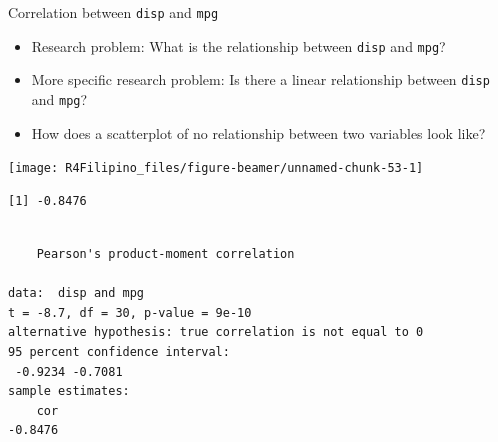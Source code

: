 \begin{frame}[fragile]{Correlation between \texttt{disp} and
\texttt{mpg}}

\begin{itemize}
\tightlist
\item
  Research problem: What is the relationship between \texttt{disp} and
  \texttt{mpg}?
\item
  More specific research problem: Is there a linear relationship between
  \texttt{disp} and \texttt{mpg}?
\item
  How does a scatterplot of no relationship between two variables look
  like?
\end{itemize}

\begin{Shaded}
\begin{Highlighting}[]
\NormalTok{(}\StringTok{ }\NormalTok{(}\NormalTok{)}
\NormalTok{(}\StringTok{ }\NormalTok{(}\NormalTok{)}
\end{Highlighting}
\end{Shaded}

\begin{center}\texttt{[image: R4Filipino\_files/figure-beamer/unnamed-chunk-53-1]} \end{center}

\begin{Shaded}
\begin{Highlighting}[]
\end{Highlighting}
\end{Shaded}

\begin{verbatim}
[1] -0.8476
\end{verbatim}

\begin{Shaded}
\begin{Highlighting}[]
\end{Highlighting}
\end{Shaded}

\begin{verbatim}

    Pearson's product-moment correlation

data:  disp and mpg
t = -8.7, df = 30, p-value = 9e-10
alternative hypothesis: true correlation is not equal to 0
95 percent confidence interval:
 -0.9234 -0.7081
sample estimates:
    cor 
-0.8476 
\end{verbatim}

\end{frame}

